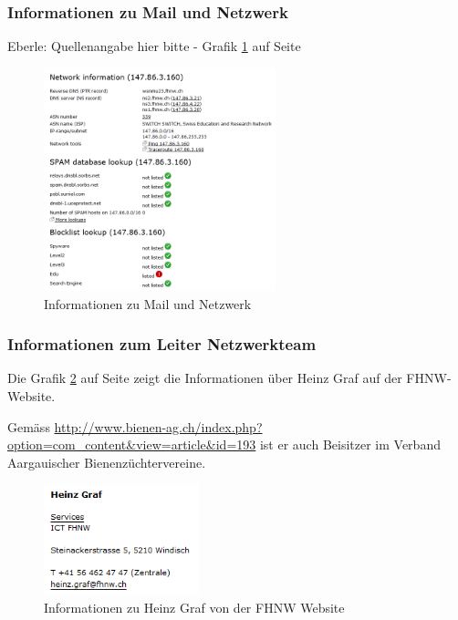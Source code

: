 \documentclass[11pt,a4paper]{scrartcl}
\begin{document}
\subsubsection{Informationen zu Mail und Netzwerk}
Eberle: Quellenangabe hier bitte - Grafik \ref{fig:iprange_infos} auf Seite \pageref{fig:iprange_infos}
\begin{figure}[p]
	\centering
	\includegraphics[width=0.6\textwidth]{../aufg5/iprange_infos.png}
	\caption{Informationen zu Mail und Netzwerk}
	\label{fig:iprange_infos}
\end{figure}

\subsubsection{Informationen zum Leiter Netzwerkteam}
Die Grafik \ref{fig:heinz_graf1} auf Seite \pageref{fig:heinz_graf1} zeigt die Informationen über Heinz Graf auf der FHNW-Website.

Gemäss \url{http://www.bienen-ag.ch/index.php?option=com_content&view=article&id=193} ist er auch Beisitzer im Verband Aargauischer Bienenzüchtervereine.
\begin{figure}[p]
	\centering
	\includegraphics[width=0.4\textwidth]{../aufg5/heinz_graf1.png}
	\caption{Informationen zu Heinz Graf von der FHNW Website}
	\label{fig:heinz_graf1}
\end{figure}
\end{document}
